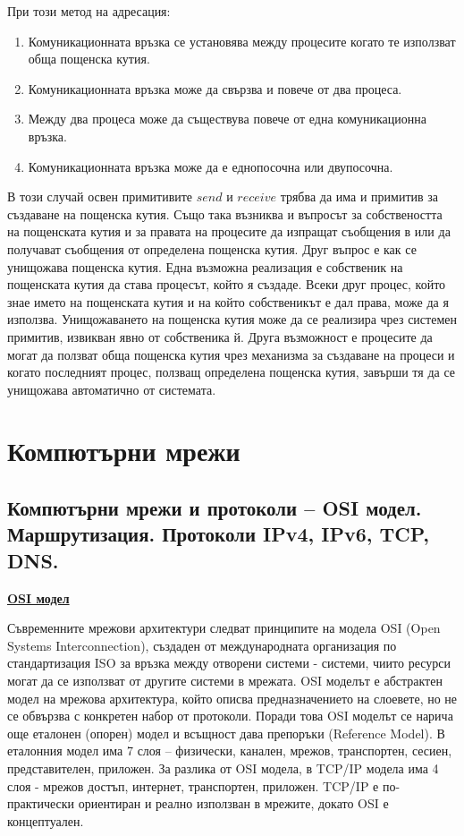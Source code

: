 \documentclass{article}
\begin{document}
При този метод на адресация:
\begin{enumerate}
    \item Комуникационната връзка се установява между процесите когато те използват обща пощенска кутия.
    \item Комуникационната връзка може да свързва и повече от два процеса.
    \item Между два процеса може да съществува повече от една комуникационна връзка.
    \item Комуникационната връзка може да е еднопосочна или двупосочна.
\end{enumerate}
В този случай освен примитивите $send$ и $receive$ трябва да има и примитив за създаване на пощенска кутия. Също така възниква и въпросът за собствеността
на пощенската кутия и за правата на процесите да изпращат съобщения в или да получават съобщения от определена пощенска кутия. Друг въпрос е как се унищожава
пощенска кутия. Една възможна реализация е собственик на пощенската кутия да става процесът, който я създаде. Всеки друг процес, който знае името на пощенската
кутия и на който собственикът е дал права, може да я използва. Унищожаването на пощенска кутия може да се реализира чрез системен примитив, извикван явно от
собственика й. Друга възможност е процесите да могат да ползват обща пощенска кутия чрез механизма за създаване на процеси и когато последният процес, ползващ
определена пощенска кутия, завърши тя да се унищожава автоматично от системата.

\section*{\centering \color{bordeaux}Компютърни мрежи}

\subsection*{\color{bordeaux}Компютърни мрежи и протоколи – OSI модел. Маршрутизация. Протоколи IPv4, IPv6, TCP, DNS.}

\textbf{\underline{OSI модел}}

Съвременните мрежови архитектури следват принципите на модела OSI (Open Systems Interconnection), създаден от
международната организация по стандартизация ISO за връзка между отворени системи - системи, чиито ресурси могат
да се използват от другите системи в мрежата. OSI моделът е абстрактен модел на мрежова архитектура, който описва
предназначението на слоевете, но не се обвързва с конкретен набор от протоколи. Поради това OSI моделът се нарича
още еталонен (опорен) модел и всъщност дава препоръки (Reference Model). В еталонния модел има 7 слоя – физически,
канален, мрежов, транспортен, сесиен, представителен, приложен. За разлика от OSI модела, в TCP/IP модела има 4 слоя - 
мрежов достъп, интернет, транспортен, приложен. TCP/IP е по-практически ориентиран и реално използван в мрежите, докато
OSI е концептуален.
\end{document}
